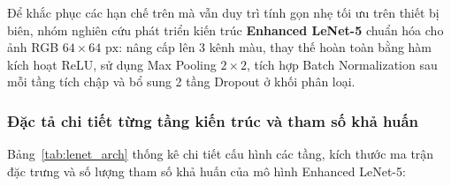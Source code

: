 Để khắc phục các hạn chế trên mà vẫn duy trì tính gọn nhẹ tối ưu trên thiết bị biên, nhóm nghiên cứu phát triển kiến trúc \textbf{Enhanced LeNet-5} chuẩn hóa cho ảnh RGB $64 \times 64\text{ px}$: nâng cấp lên 3 kênh màu, thay thế hoàn toàn bằng hàm kích hoạt ReLU, sử dụng Max Pooling $2 \times 2$, tích hợp Batch Normalization sau mỗi tầng tích chập và bổ sung 2 tầng Dropout ở khối phân loại.

\subsubsection{Đặc tả chi tiết từng tầng kiến trúc và tham số khả huấn}
\label{subsubsec:lenet_kien_truc}

Bảng~\ref{tab:lenet_arch} thống kê chi tiết cấu hình các tầng, kích thước ma trận đặc trưng và số lượng tham số khả huấn của mô hình Enhanced LeNet-5:


